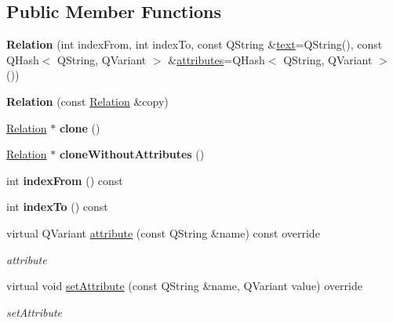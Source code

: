\subsection*{Public Member Functions}
\begin{DoxyCompactItemize}
\item 
\mbox{\label{class_relation_a9fac1afe32c8b1cfde60e7abc72db83d}} 
{\bfseries Relation} (int index\+From, int index\+To, const Q\+String \&\hyperlink{class_annotation_element_aa59bd98501e3882990681f6aff2ee863}{text}=Q\+String(), const Q\+Hash$<$ Q\+String, Q\+Variant $>$ \&\hyperlink{class_annotation_element_a58082d92f50c4fde2d18ce24ef3fd283}{attributes}=Q\+Hash$<$ Q\+String, Q\+Variant $>$())
\item 
\mbox{\label{class_relation_ae2ea82b1be4d9b41287566266cbba3c1}} 
{\bfseries Relation} (const \hyperlink{class_relation}{Relation} \&copy)
\item 
\mbox{\label{class_relation_a380c5c9467c2532448e63a0308027e14}} 
\hyperlink{class_relation}{Relation} $\ast$ {\bfseries clone} ()
\item 
\mbox{\label{class_relation_a9223f410412b4b396b37d5e2e497e5fa}} 
\hyperlink{class_relation}{Relation} $\ast$ {\bfseries clone\+Without\+Attributes} ()
\item 
\mbox{\label{class_relation_a8adb9981a4eee2e0bdef72d960ff5ce9}} 
int {\bfseries index\+From} () const
\item 
\mbox{\label{class_relation_ac88e95a051161a85f30de6b0c890607c}} 
int {\bfseries index\+To} () const
\item 
virtual Q\+Variant \hyperlink{class_relation_a424ac3f46c1a62f2f72592dcf10d1f1e}{attribute} (const Q\+String \&name) const override
\begin{DoxyCompactList}\small\item\em attribute \end{DoxyCompactList}\item 
virtual void \hyperlink{class_relation_ae669645f5fc531a6118d68b51a4d64df}{set\+Attribute} (const Q\+String \&name, Q\+Variant value) override
\begin{DoxyCompactList}\small\item\em set\+Attribute \end{DoxyCompactList}\item 

\end{DoxyCompactItemize}
